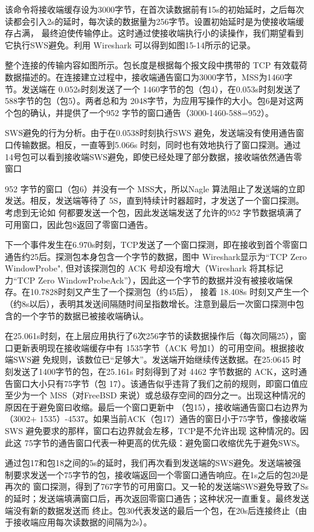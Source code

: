 该命令将接收端缓存设为3000字节，在首次读数据前有15s的初始延时，之后每次读都会引入2s的延时，每次读的数据量为256字节。设置初始延时是为使接收端缓存占满，
最终迫使传输停止。这时通过使接收端执行小的读操作，我们期望看到它执行SWS避免。利用 Wireshark 可以得到如图15-14所示的记录。

整个连接的传输内容如图所示。包长度是根据每个报文段中携带的 TCP 有效载荷数据描述的。在连接建立过程中，接收端通告窗口为3000字节，MSS为1460字节。发送端在
0.052s时刻发送了一个 1460字节的包（包4），在0.053s时刻发送了588字节的包（包5）。两者总和为 2048字节，为应用写操作的大小。包6是对这两个包的确认，并提供了一个952
字节的窗口通告（3000-1460-588=952）。

SWS避免的行为分析。由于在0.0538时刻执行SWS 避免，发送端没有使用通告窗口传输数据。相反，一直等到5.066s 时刻，同时也有效地执行了窗口探测。通过14号包可以看到接收端SWS避免，即使已经处理了部分数据，接收端依然通告零窗口

952 字节的窗口（包6）并没有一个 MSS大，所以Nagle 算法阻止了发送端的立即发送。相反，发送端等待了 5S，直到特续计时器超时，才发送了一个窗口探测。考虑到无论如
何都要发送一个包，因此发送端发送了允许的952 字节数据填满了可用窗口，因此包8返回了零窗口通告。

下一个事件发生在6.970s时刻，TCP发送了一个窗口探测，即在接收到首个零窗口通告约25后。探测包本身包含一个字节的数据，图中 Wireshark显示为“TCP Zero WindowProbe",
但对该探测包的 ACK 号却没有增大（Wireshark 将其标记力“TCP Zero WindowProbeAck”），因此这一个字节的数据并没有被接收端保存。在10.7828时刻又产生了一个探测包（约45后），
接着 18.408s 时刻又产生一个（约8s以后），表明其发送间隔随时间呈指数增长。注意到最后一次窗口探测中包含的一个字节的数据已被接收端确认。

在25.061s时刻，在上层应用执行了6次256字节的读数据操作后（每次同隔25），窗口更新表明现在接收端缓存中有 1535字节（ACK 号加1）的可用空间。根据接收端SWS避
免规则，该数位已“足够大”。发送端开始继续传送数据。在25:0645 时刻发送了1400字节的包，在25.161s 时刻得到了对 4462 字节数据的 ACK，这时通告窗口大小只有75字节（包
17）。该通告似乎违背了我们之前的规则，即窗口值应至少为一个 MSS（对FreeBSD 来说）或总级存空间的四分之一。出现这种情况的原因在于避免窗曰收缩。最后一个窗口更新中
（包15），接收端通告窗口右边界为（3002+ 1535）-4537。如果当前ACK（包17）通告的窗日小于75字节，像接收端SWS 避免要求的那样，窗口右边界就会左移，TCP是不允许出现
这种情况的。因此这 75字节的通告窗口代表一种更高的优先级：避免窗口收缩优先于避免SWS。

通过包17和包18之间的5s的延时，我们再次看到发送端的SWS避免。发送端被强制要求发送一个75字节的包，接收端返回一个零窗口通告响应。在1s之后的包20是再次的
窗口探测，得到了767字节的可用窗口。又一轮的发送端SWS避免导致了Ss的延时；发送端填满窗口后，再次返回零窗口通告；这种状况一直重复。最终发送端没有新的数据发送而
终止。包30代表发送的最后一个包，在20s后连接终止（由于接收端应用每次读数据的间隔为2s）。

